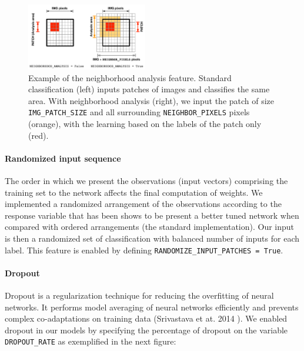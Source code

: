 \documentclass[fleqn,9 pt]{SelfArx} %
\begin{document}
\begin{sloppypar}
\begin{figure}[H]
\centering
\includegraphics[width=0.47\textwidth]{figures/NEIGHBORHOOD_ANALYSIS.pdf}
\caption{\small Example of the neighborhood analysis feature. Standard classification (left) inputs patches of images and classifies the same area. With neighborhood analysis (right), we input the patch of size \texttt{IMG\_PATCH\_SIZE} and all surrounding \texttt{NEIGHBOR\_PIXELS} pixels (orange), with the learning based on the labels of the patch only (red).}
\end{figure}

\paragraph{Randomized input sequence}

The order in which we present the observations (input vectors) comprising the training set to the network affects the final computation of weights. We implemented a randomized arrangement of the observations according to the response variable that has been shows to be present a better tuned network when compared with ordered arrangements (the standard implementation). Our input is then a randomized set of classification with balanced number of inputs for each label. This feature is enabled by defining \texttt{RANDOMIZE\_INPUT\_PATCHES = True}.

\paragraph{Dropout}

Dropout is a regularization technique for reducing the overfitting of neural networks. It performs model averaging of neural networks efficiently and prevents complex co-adaptations on training data (Srivastava et at. 2014 \cite{srivastava2014dropout}). We enabled dropout in our models by specifying the percentage of dropout on the variable \texttt{DROPOUT\_RATE} as exemplified in the next figure:


\end{sloppypar}
\end{document}
